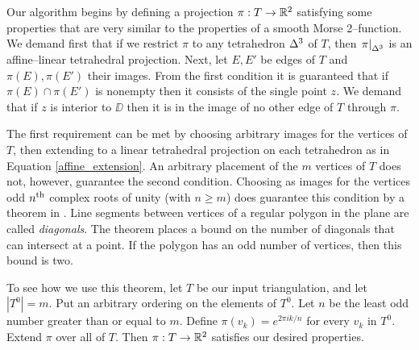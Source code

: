 \label{alg:proj}
Our algorithm begins by defining a projection $\pi:T\to\mathbb{R}^2$ satisfying some properties that are very similar to the properties of a smooth Morse 2--function.
We demand first that if we restrict $\pi$ to any tetrahedron $\Delta^3$ of $T$, then $\left.\pi\right|_{\Delta^3}$ is an affine--linear tetrahedral projection.
Next, let $E,E'$ be edges of $T$ and $\pi(E),\pi(E')$ their images.
From the first condition it is guaranteed that if $\pi(E)\cap\pi(E')$ is nonempty then it consists of the single point $z$.
We demand that if $z$ is interior to $\DD$ then it is in the image of no other edge of $T$ through $\pi$.

The first requirement can be met by choosing arbitrary images for the vertices of $T$, then extending to a linear tetrahedral projection on each tetrahedron as in Equation \ref{affine_extension}.
An arbitrary placement of the $m$ vertices of $T$ does not, however, guarantee the second condition.
Choosing as images for the vertices odd $n^{\text{th}}$ complex roots of unity (with $n\geq m$) does guarantee this condition by a theorem in \cite{PoonRub98}.
Line segments between vertices of a regular polygon in the plane are called \emph{diagonals}.
The theorem places a bound on the number of diagonals that can intersect at a point.
If the polygon has an odd number of vertices, then this bound is two.

To see how we use this theorem, let $T$ be our input triangulation, and let $|T^0|=m$.
Put an arbitrary ordering on the elements of $T^0$.
Let $n$ be the least odd number greater than or equal to $m$.
Define $\pi(v_k)=e^{2\pi i k/n}$ for every $v_k$ in $T^0$.
Extend $\pi$ over all of $T$.
Then $\pi:T\to\mathbb{R}^2$ satisfies our desired properties.
